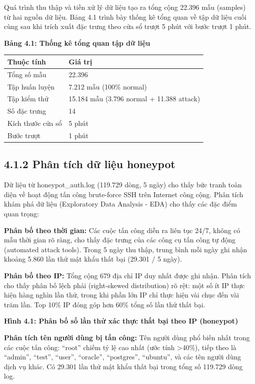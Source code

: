 \documentclass[
  a4paper]{report}
\newcounter{none} %
\begin{document}
Quá trình thu thập và tiền xử lý dữ liệu tạo ra tổng cộng 22.396 mẫu
(samples) từ hai nguồn dữ liệu. Bảng 4.1 trình bày thống kê tổng quan về
tập dữ liệu cuối cùng sau khi trích xuất đặc trưng theo cửa sổ trượt 5
phút với bước trượt 1 phút.

\textbf{Bảng 4.1: Thống kê tổng quan tập dữ liệu}

{\def\LTcaptype{none} %
\begin{longtable}[]{@{}ll@{}}
\toprule\noalign{}
Thuộc tính & Giá trị \\
\midrule\noalign{}
\endhead
\bottomrule\noalign{}
\endlastfoot
Tổng số mẫu & 22.396 \\
Tập huấn luyện & 7.212 mẫu (100\% normal) \\
Tập kiểm thử & 15.184 mẫu (3.796 normal + 11.388 attack) \\
Số đặc trưng & 14 \\
Kích thước cửa sổ & 5 phút \\
Bước trượt & 1 phút \\
\end{longtable}
}

\subsection{4.1.2 Phân tích dữ liệu
honeypot}\label{phuxe2n-tuxedch-dux1eef-liux1ec7u-honeypot}

Dữ liệu từ honeypot\_auth.log (119.729 dòng, 5 ngày) cho thấy bức tranh
toàn diện về hoạt động tấn công brute-force SSH trên Internet công cộng.
Phân tích khám phá dữ liệu (Exploratory Data Analysis - EDA) cho thấy
các đặc điểm quan trọng:

\textbf{Phân bố theo thời gian:} Các cuộc tấn công diễn ra liên tục
24/7, không có mẫu thời gian rõ ràng, cho thấy đặc trưng của các công cụ
tấn công tự động (automated attack tools). Trong 5 ngày thu thập, trung
bình mỗi ngày ghi nhận khoảng 5.860 lần thử mật khẩu thất bại (29.301 /
5 ngày).

\textbf{Phân bố theo IP:} Tổng cộng 679 địa chỉ IP duy nhất được ghi
nhận. Phân tích cho thấy phân bố lệch phải (right-skewed distribution)
rõ rệt: một số ít IP thực hiện hàng nghìn lần thử, trong khi phần lớn IP
chỉ thực hiện vài chục đến vài trăm lần. Top 10\% IP đóng góp hơn 60\%
tổng số lần thử thất bại.

\textbf{Hình 4.1: Phân bố số lần thử xác thực thất bại theo IP
(honeypot)}

\textbf{Phân tích tên người dùng bị tấn công:} Tên người dùng phổ biến
nhất trong các cuộc tấn công: ``root'' chiếm tỷ lệ cao nhất (ước tính
\textgreater40\%), tiếp theo là ``admin'', ``test'', ``user'',
``oracle'', ``postgres'', ``ubuntu'', và các tên người dùng dịch vụ
khác. Có 29.301 lần thử mật khẩu thất bại trong tổng số 119.729 dòng
log.
\end{document}
